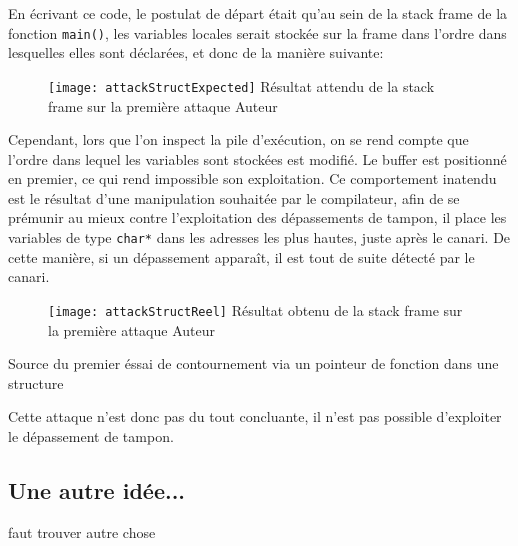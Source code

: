 En écrivant ce code, le postulat de départ était qu'au sein de la \og stack frame \fg de la fonction \texttt{main()}, les variables locales serait stockée sur la frame dans l'ordre dans lesquelles elles sont déclarées, et donc de la manière suivante:

\begin{figure}[H]
	\centering
	\texttt{[image: attackStructExpected]}
	{Résultat attendu de la \og stack frame \fg sur la première attaque}
	{Auteur}
	\label{fig:attackStructExpected}
\end{figure}

Cependant, lors que l'on inspect la pile d'exécution, on se rend compte que l'ordre dans lequel les variables sont stockées est modifié. Le \og buffer \fg est positionné en premier, ce qui rend impossible son exploitation. Ce comportement inatendu est le résultat d'une manipulation souhaitée par le compilateur, afin de se prémunir au mieux contre l'exploitation des dépassements de tampon, il place les variables de type \texttt{char*} dans les adresses les plus hautes, juste après le canari. De cette manière, si un dépassement apparaît, il est tout de suite détecté par le canari.

\begin{figure}[H]
	\centering
	\texttt{[image: attackStructReel]}
	{Résultat obtenu de la \og stack frame \fg sur la première attaque}
	{Auteur}
	\label{fig:attackStructReel}
\end{figure}

\begin{listing}
	\caption{Source du premier éssai de contournement via un pointeur de fonction dans une structure}
	\label{lst:struct}
\end{listing}

Cette attaque n'est donc pas du tout concluante, il n'est pas possible d'exploiter le dépassement de tampon.

\subsection{Une autre idée...}
faut trouver autre chose

